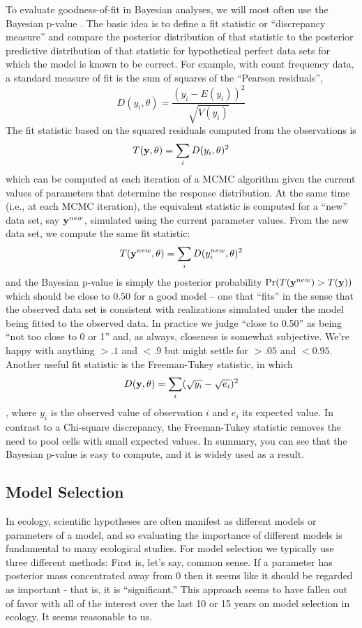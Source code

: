 To evaluate goodness-of-fit in Bayesian analyses, we will most often
use the Bayesian p-value \citep{gelman_etal:1996}.  The basic idea is to define
a fit statistic or ``discrepancy measure'' and compare the posterior distribution of that
statistic to the posterior predictive distribution of that statistic
for hypothetical perfect data sets for which the model is known to be correct. For
example, with count frequency data, a standard measure of fit is the
sum of squares of the ``Pearson residuals'',
\[
D(y_i,\theta) = \frac{(y_i - E(y_i))^{2}}{\sqrt{V( y_{i} )}}
\]
The fit statistic based on the squared residuals computed from the
observations is 
\[
T({\bf y}, \theta) = \sum_{i} D(y_{i},\theta)^{2}
\]
which can be computed at each iteration of a MCMC algorithm given the
current values of parameters that determine the
 response distribution.  At the same time (i.e., at each MCMC
 iteration),
the equivalent statistic is computed for a
``new'' data set, say ${\bf y}^{new}$, 
simulated using the current parameter values. From the new data set,
we compute the same fit statistic:
\[
T({\bf y}^{new}, \theta) = \sum_{i} D(y_{i}^{new},\theta)^{2}
\]
and 
the
Bayesian p-value is simply the posterior probability $\Pr(T({\bf
  y}^{new})  >  T({\bf y}))$
 which should be close to $0.50$ for a good model -- one that
 ``fits'' in the sense that the observed data set is
 consistent with realizations simulated under the model being fitted
 to the observed data. In practice
we judge ``close to 0.50'' as being ``not too close to 0 or 1'' and,
as always, closeness is somewhat subjective. We're happy with anything
$>.1$ and $<.9$ but might settle for $>.05$ and $<0.95$. 
Another useful fit statistic is the Freeman-Tukey
statistic, in which
\[
D({\bf y},\theta) = \sum_{i} ( \sqrt{y_{i}} - \sqrt{e_{i}} )^2
\]
\citep{brooks_etal:2000}, where $y_{i}$ is the observed value of
observation $i$ and $e_{i}$ its expected value. In contrast to a
Chi-square discrepancy, the Freeman-Tukey statistic removes the need
to pool cells with small expected values.
In summary, you can see that 
the Bayesian p-value is easy to compute,
and it is widely used as a result.


\subsection{Model Selection }

In ecology, scientific hypotheses are often manifest as different models or parameters
 of a model, and so
evaluating the importance of different models is fundamental 
to many ecological studies.
For model selection we typically use three different methods: First
is, let's say, common sense. If a parameter has posterior mass
concentrated away from 0 then it seems like it should be regarded as
important - that is, it is ``significant.''  This approach seems to
have fallen out of favor with all of the interest over the last 10 or
15 years on model selection in ecology. It seems reasonable to us.


